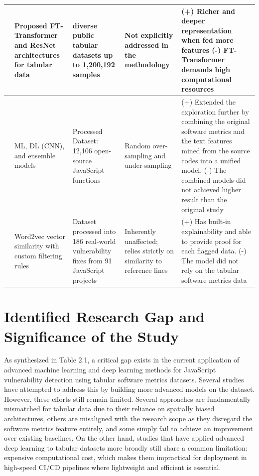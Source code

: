 {\begin{longtable}{|>{\raggedright\arraybackslash}p{2.2cm}|>{\raggedright\arraybackslash}p{2.6cm}|>{\raggedright\arraybackslash}p{2.7cm}|>{\raggedright\arraybackslash}p{2.3cm}|>{\raggedright\arraybackslash}p{3.2cm}|}
\hline
\citet{gorishniy_revisiting_2023} & Proposed FT-Transformer and ResNet architectures for tabular data & 11 diverse public tabular datasets up to 1,200,192 samples & Not explicitly addressed in the methodology & (+) Richer and deeper representation when fed more features (-) FT-Transformer demands high computational resources \\
\hline
\citet{kalouptsoglou_examining_2022} & ML, DL (CNN), and ensemble models & Processed \citet{ferenc_challenging_2019} Dataset: 12,106 open-source JavaScript functions & Random over-sampling and under-sampling & (+) Extended the exploration further by combining the original software metrics and the text features mined from the source codes into a unified model. (-) The combined models did not achieved higher result than the original study \\
\hline
\citet{mosolygo_towards_2021} & Word2vec vector similarity with custom filtering rules & \citet{ferenc_challenging_2019} Dataset processed into 186 real-world vulnerability fixes from 91 JavaScript projects & Inherently unaffected; relies strictly on similarity to reference lines & (+) Has built-in explainability and able to provide proof for each flagged data. (-) The model did not rely on the tabular software metrics data \\
\hline
\end{longtable}
}

\section{Identified Research Gap and Significance of the Study}

As synthesized in Table 2.1, a critical gap exists in the current application of advanced machine learning and deep learning methods for JavaScript vulnerability detection using tabular software metrics datasets. Several studies have attempted to address this by building more advanced models on the dataset. However, these efforts still remain limited. Several approaches are fundamentally mismatched for tabular data due to their reliance on spatially biased architectures, others are misaligned with the research scope as they disregard the software metrics feature entirely, and some simply fail to achieve an improvement over existing baselines. On the other hand, studies that have applied advanced deep learning to tabular datasets more broadly still share a common limitation: expensive computational cost, which makes them impractical for deployment in high-speed CI/CD pipelines where lightweight and efficient is essential.

